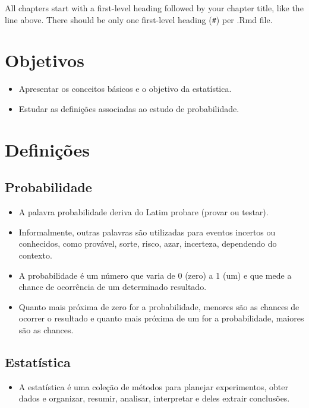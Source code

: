 \documentclass[
]{book}
\providecommand{\tightlist}{%
  \setlength{\itemsep}{0pt}\setlength{\parskip}{0pt}}
\begin{document}
All chapters start with a first-level heading followed by your chapter title, like the line above. There should be only one first-level heading (\texttt{\#}) per .Rmd file.

\hypertarget{objetivos-1}{%
\section{Objetivos}\label{objetivos-1}}

\begin{itemize}
\item
  Apresentar os conceitos básicos e o objetivo da estatística.
\item
  Estudar as definições associadas ao estudo de probabilidade.
\end{itemize}

\hypertarget{definiuxe7uxf5es}{%
\section{Definições}\label{definiuxe7uxf5es}}

\hypertarget{probabilidade}{%
\subsection{Probabilidade}\label{probabilidade}}

\begin{itemize}
\item
  A palavra probabilidade deriva do Latim probare (provar ou testar).
\item
  Informalmente, outras palavras são utilizadas para eventos incertos ou conhecidos, como provável, sorte, risco, azar, incerteza, dependendo do contexto.
\item
  A probabilidade é um número que varia de 0 (zero) a 1 (um) e que mede a chance de ocorrência de um determinado resultado.
\item
  Quanto mais próxima de zero for a probabilidade, menores são as chances de ocorrer o resultado e quanto mais próxima de um for a probabilidade, maiores são as chances.
\end{itemize}

\hypertarget{estatuxedstica-1}{%
\subsection{Estatística}\label{estatuxedstica-1}}

\begin{itemize}
\tightlist
\item
  A estatística é uma coleção de métodos para planejar experimentos, obter dados e organizar, resumir, analisar, interpretar e deles extrair conclusões.
\end{itemize}
\end{document}

